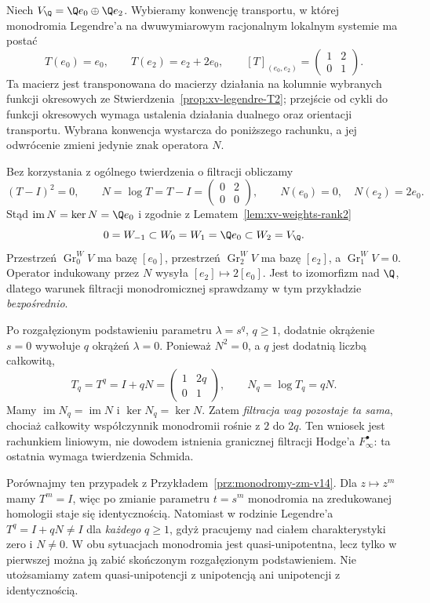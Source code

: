 \begin{przyklad}
\label{prz:xv-legendre-weight-explicit}
Niech $V_\Q=\Q e_0\oplus\Q e_2$.
Wybieramy konwencję transportu, w której
monodromia Legendre'a na dwuwymiarowym
racjonalnym lokalnym systemie ma postać
\[
 T(e_0)=e_0,\qquad T(e_2)=e_2+2e_0,
 \qquad
 [T]_{(e_0,e_2)}
 =\begin{pmatrix}1&2\\0&1\end{pmatrix}.
\]
Ta macierz jest transponowana do macierzy
działania na kolumnie wybranych funkcji okresowych
ze Stwierdzenia~\ref{prop:xv-legendre-T2};
przejście od cykli do funkcji okresowych wymaga
ustalenia działania dualnego oraz orientacji
transportu. Wybrana konwencja wystarcza
do poniższego rachunku, a jej odwrócenie
zmieni jedynie znak operatora $N$.

Bez korzystania z ogólnego twierdzenia o filtracji
obliczamy
\[
 (T-I)^2=0,\qquad
 N=\log T=T-I
 =\begin{pmatrix}0&2\\0&0\end{pmatrix},
 \qquad
 N(e_0)=0,\quad N(e_2)=2e_0.
\]
Stąd
$\operatorname{im}N=\ker N=\Q e_0$
i zgodnie z Lematem~\ref{lem:xv-weights-rank2}
\[
 0=W_{-1}\subset
 W_0=W_1=\Q e_0\subset W_2=V_\Q.
\]
Przestrzeń $\operatorname{Gr}_0^WV$ ma bazę $[e_0]$,
przestrzeń $\operatorname{Gr}_2^WV$ ma bazę $[e_2]$,
a $\operatorname{Gr}_1^WV=0$.
Operator indukowany przez $N$ wysyła
$[e_2]\mapsto2[e_0]$.
Jest to izomorfizm nad $\Q$, dlatego
warunek filtracji monodromicznej
sprawdzamy w tym przykładzie \emph{bezpośrednio}.

Po rozgałęzionym podstawieniu parametru
$\lambda=s^q$, $q\ge1$, dodatnie okrążenie $s=0$
wywołuje $q$ okrążeń $\lambda=0$.
Ponieważ $N^2=0$, a $q$ jest dodatnią liczbą całkowitą,
\[
 T_q=T^q=I+qN
 =\begin{pmatrix}1&2q\\0&1\end{pmatrix},
 \qquad
 N_q=\log T_q=qN.
\]
Mamy $\operatorname{im}N_q=\operatorname{im}N$
i $\ker N_q=\ker N$.
Zatem \emph{filtracja wag pozostaje ta sama},
chociaż całkowity współczynnik monodromii
rośnie z $2$ do $2q$.
Ten wniosek jest rachunkiem liniowym,
nie dowodem istnienia granicznej filtracji
Hodge'a $F_\infty^\bullet$: ta ostatnia
wymaga twierdzenia Schmida.

Porównajmy ten przypadek z Przykładem~\ref{prz:monodromy-zm-v14}.
Dla $z\mapsto z^m$ mamy $T^m=I$, więc po zmianie parametru
$t=s^m$ monodromia na zredukowanej homologii
staje się identycznością. Natomiast w rodzinie Legendre'a
$T^q=I+qN\ne I$ dla \emph{każdego} $q\ge1$,
gdyż pracujemy nad ciałem charakterystyki zero i $N\ne0$.
W obu sytuacjach monodromia jest quasi-unipotentna,
lecz tylko w pierwszej można ją zabić skończonym
rozgałęzionym podstawieniem. Nie utożsamiamy zatem
quasi-unipotencji z unipotencją ani unipotencji
z identycznością.
\end{przyklad}


